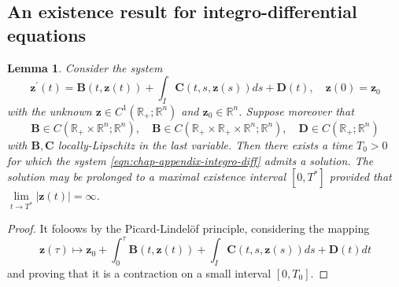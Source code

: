 \documentclass[10pt,a4paper]{article}
\newtheorem{lemma}[theorem]{Lemma}
\numberwithin{equation}{section}
\begin{document}
\subsection{An existence result for integro-differential equations}\label{sec:appendix-integro-diff}
\begin{lemma}
Consider the system 
\begin{equation}\label{eqn:chap-appendix-integro-diff}
\mathbf{z}^{\prime}\left(t\right)=\mathbf{B}\left(t,\mathbf{z}\left(t\right)\right)+\int_{I}\mathbf{C}\left(t,s,\mathbf{z}\left(s\right)\right)ds+\mathbf{D}\left(t\right),\quad\mathbf{z}\left(0\right)=\mathbf{z}_{0}
\end{equation}
with the unknown $\mathbf{z}\in C^{1}\left(\mathbb{R_{+}};\mathbb{R}^{n}\right)$ and $\mathbf{z}_{0} \in \mathbb{R}^{n}$. Suppose moreover that 
\[\mathbf{B}\in C\left(\mathbb{R}_{+}\times\mathbb{R}^{n};\mathbb{R}^{n}\right),\quad\mathbf{B}\in C\left(\mathbb{R}_{+}\times\mathbb{R}_{+}\times\mathbb{R}^{n};\mathbb{R}^{n}\right),\quad\mathbf{D}\in C\left(\mathbb{R}_{+};\mathbb{R}^{n}\right)\]
with $\mathbf{B,C}$ locally-Lipschitz in the last variable. Then there exists a time $T_0 >0$ for which the system \eqref{eqn:chap-appendix-integro-diff} admits a solution. The solution may be prolonged to a maximal existence interval $\left[0,T^{*}\right]$ provided that $\lim\limits_{t\to T^{*}}\left|\mathbf{z}\left(t\right)\right|=\infty$.
\end{lemma}
\begin{proof}
  It foloows by the Picard-Lindel\"{o}f principle, considering the mapping 
  \[
\mathbf{z}\left(\tau\right)\mapsto\mathbf{z}_{0}+\int_{0}^{\tau}\mathbf{B}\left(t,\mathbf{z}\left(t\right)\right)+\int_{I}\mathbf{C}\left(t,s,\mathbf{z}\left(s\right)\right)ds+\mathbf{D}\left(t\right)dt
  \]
  and proving that it is a contraction on a small interval $[0,T_0]$.
\end{proof}
\end{document}
